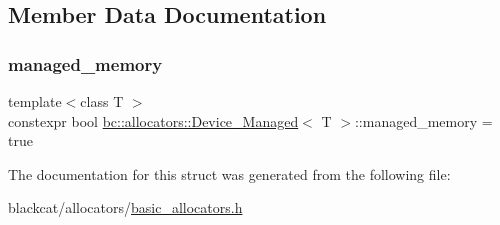\subsection{Member Data Documentation}
\mbox{\label{structbc_1_1allocators_1_1Device__Managed_a76f220b78bda7fc2f3c3f50645c35753}} 
\subsubsection{\texorpdfstring{managed\+\_\+memory}{managed\_memory}}
{\footnotesize\ttfamily template$<$class T $>$ \\
constexpr bool \hyperlink{structbc_1_1allocators_1_1Device__Managed}{bc\+::allocators\+::\+Device\+\_\+\+Managed}$<$ T $>$\+::managed\+\_\+memory = true\hspace{0.3cm}{\ttfamily [static]}}



The documentation for this struct was generated from the following file\+:\begin{DoxyCompactItemize}
\item 
blackcat/allocators/\hyperlink{basic__allocators_8h}{basic\+\_\+allocators.\+h}\end{DoxyCompactItemize}
